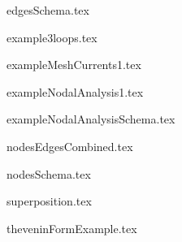\begin{frame}{edgesSchema.tex}
\begin{center}

\end{center}
\end{frame}

\begin{frame}{example3loops.tex}
\begin{center}

\end{center}
\end{frame}

\begin{frame}{exampleMeshCurrents1.tex}
\begin{center}

\end{center}
\end{frame}

\begin{frame}{exampleNodalAnalysis1.tex}
\begin{center}

\end{center}
\end{frame}

\begin{frame}{exampleNodalAnalysisSchema.tex}
\begin{center}

\end{center}
\end{frame}

\begin{frame}{nodesEdgesCombined.tex}
\begin{center}

\end{center}
\end{frame}

\begin{frame}{nodesSchema.tex}
\begin{center}

\end{center}
\end{frame}

\begin{frame}{superposition.tex}
\begin{center}

\end{center}
\end{frame}

\begin{frame}{theveninFormExample.tex}
\begin{center}

\end{center}
\end{frame}

